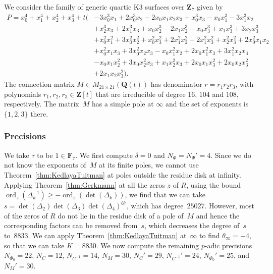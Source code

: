 \documentclass[a4paper,11pt]{article}
\numberwithin{equation}{section}
\newcommand{\ZZ}{\mathbf{Z}} %
\newcommand{\QQ}{\mathbf{Q}} %
\newcommand{\FF}{\mathbf{F}} %
\DeclareMathOperator{\ord}{ord}          %
\theoremstyle{definition}
\begin{document}
We consider the family of generic quartic K3 surfaces over $\ZZ_{7}$ given by 
\begin{equation*}
\begin{split}
P=x_0^4 + x_1^4 + x_2^4 + x_3^4 
+ t \bigl( & -3 x_0^3 x_1 + 2 x_0^3 x_2 - 2 x_0 x_1 x_2 x_3 + x_0^3 x_3 - x_0 x_1^3 - 3 x_1^3 x_2 \\ 
           & + x_2^3 x_3 + 2 x_1^3 x_3 + x_0 x_2^3 - 2 x_1 x_2^3 - x_0 x_3^3 + x_1 x_3^3 + 3 x_2 x_3^3 \\
           & + x_0^2 x_1^2 + 3 x_0^2 x_2^2 + x_0^2 x_3^2 + 2 x_1^2 x_2^2 - 2 x_1^2 x_3^2 + x_2^2 x_3^2 + 2 x_0^2 x_1 x_2 \\ 
           & + x_0^2 x_1 x_3 + 3 x_0^2 x_2 x_3 - x_0 x_1^2 x_2 + 2 x_0 x_1^2 x_3 + 3 x_1^2 x_2 x_3 \\
           & - x_0 x_1 x_2^2 + 3 x_0 x_2^2 x_3 + x_1 x_2^2 x_3 + 2 x_0 x_1 x_3^2 + 2 x_0 x_2 x_3^2 \\
           & + 2 x_1 x_2 x_3^2 \bigr).
\end{split}
\end{equation*}
The connection matrix $M \in M_{21 \times 21}(\QQ(t))$ has denominator 
$r = r_1 r_2 r_3$, with polynomials $r_1,r_2,r_3 \in \ZZ[t]$ that are 
irreducible of degree $16$, $104$ and $108$, respectively.  The matrix~$M$ 
has a simple pole at $\infty$ and the set of exponents is $\{1,2,3\}$ there.

\subsubsection{Precisions}

We take $\tau$ to be  $1 \in \FF_7$. We first compute $\delta=0$ and 
$N_{\Phi}=N_{\Phi}'=4$. Since we do not know the exponents of~$M$ at 
its finite poles, we cannot use Theorem~\ref{thm:KedlayaTuitman} at poles 
outside the residue disk at infinity. Applying Theorem~\ref{thm:Gerkmann} 
at all the zeros $z$ of $R$, using the bound 
$\ord_z(\Delta_k^{-1}) \geq -\ord_z(\det(\Delta_k))$, we find that we can 
take $s = \det(\Delta_2)\det(\Delta_3)\det(\Delta_4)^{67}$, which has 
degree~$25027$. However, most of the zeros of $R$ do not lie in the 
residue disk of a pole of~$M$ and hence the corresponding factors can 
be removed from~$s$, which decreases the degree of~$s$ to~$8833$.  
We can apply Theorem~\ref{thm:KedlayaTuitman} at~$\infty$ to find 
$\theta_{\infty}=-4$, so that we can take $K=8830$. We now compute 
the remaining $p$-adic precisions $N_{\Phi_0}=22$, $N_C=12$, $N_{C^{-1}}=14$, 
$N_M=30$, $N_C'=29$, $N_{C^{-1}}'=24$, $N_{\Phi_0}'=25$, and $N_M'=30$.
\end{document}
